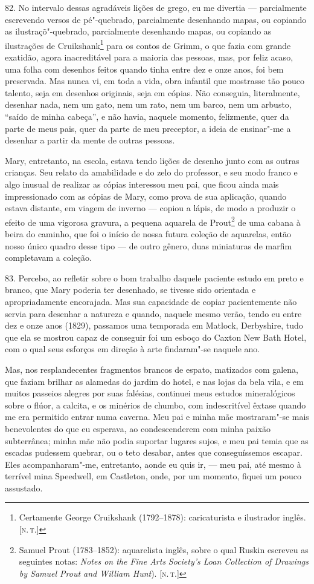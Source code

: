 82. No intervalo dessas agradáveis lições de grego, eu me divertia ---
parcialmente escrevendo versos de pé"-quebrado, parcialmente desenhando
mapas, ou copiando as ilustraçõ"-quebrado, parcialmente desenhando mapas,
ou copiando as
ilustrações
de Cruikshank\footnote{Certamente George Cruikshank (1792--1878):
  caricaturista e ilustrador inglês. {[}\textsc{n.\,t.}{]}} para os contos de
Grimm, o que fazia com grande exatidão, agora inacreditável para a
maioria das pessoas, mas, por feliz acaso, uma folha com desenhos feitos
quando tinha entre dez e onze anos, foi bem preservada. Mas nunca vi, em
toda a vida, obra infantil que mostrasse tão pouco talento, seja em
desenhos originais, seja em cópias. Não conseguia, literalmente,
desenhar nada, nem um gato, nem um rato, nem um barco, nem um arbusto,
``saído de minha cabeça'', e não havia, naquele momento, felizmente,
quer da parte de meus pais, quer da parte de meu preceptor, a ideia de
ensinar"-me a desenhar a partir da mente de outras pessoas.

Mary, entretanto, na escola, estava tendo lições de desenho junto com as
outras crianças. Seu relato da amabilidade e do zelo do professor, e seu
modo franco e algo inusual de realizar as cópias interessou meu pai, que
ficou ainda mais impressionado com as cópias de Mary, como prova de sua
aplicação, quando estava distante, em viagem de inverno --- copiou a
lápis, de modo a produzir o efeito de uma vigorosa gravura, a pequena
aquarela de Prout\footnote{Samuel Prout (1783--1852): aquarelista inglês,
  sobre o qual Ruskin escreveu as seguintes notas: \emph{Notes on the
  Fine Arts} \emph{Society's Loan Collection of Drawings by Samuel Prout
  and William Hunt}). {[}\textsc{n.\,t.}{]}} de uma cabana à beira do caminho,
que foi o início de nossa futura coleção de aquarelas, então nosso único
quadro desse tipo --- de outro gênero, duas miniaturas de marfim
completavam a coleção.

83. Percebo, ao refletir sobre o bom trabalho daquele paciente estudo em
preto e branco, que Mary poderia ter desenhado, se tivesse sido
orientada e apropriadamente encorajada. Mas sua capacidade de copiar
pacientemente não servia para desenhar a natureza e quando, naquele
mesmo verão, tendo eu entre dez e onze anos (1829), passamos uma
temporada em Matlock, Derbyshire, tudo que ela se mostrou capaz de
conseguir foi um esboço do Caxton New Bath Hotel, com o qual seus
esforços em direção à arte findaram"-se naquele ano.

Mas, nos resplandecentes fragmentos brancos de espato, matizados com
galena, que faziam brilhar as alamedas do jardim do hotel, e nas lojas
da bela vila, e em muitos passeios alegres por suas falésias, continuei
meus estudos mineralógicos sobre o flúor, a calcita, e os minérios de
chumbo, com indescritível êxtase quando me era permitido entrar numa
caverna. Meu pai e minha mãe mostraram"-se mais benevolentes do que eu
esperava, ao condescenderem com minha paixão subterrânea; minha mãe não
podia suportar lugares sujos, e meu pai temia que as escadas pudessem
quebrar, ou o teto desabar, antes que conseguíssemos escapar. Eles
acompanharam"-me, entretanto, aonde eu quis ir, --- meu pai, até mesmo à
terrível mina Speedwell, em Castleton, onde, por um momento, fiquei um
pouco assustado.

